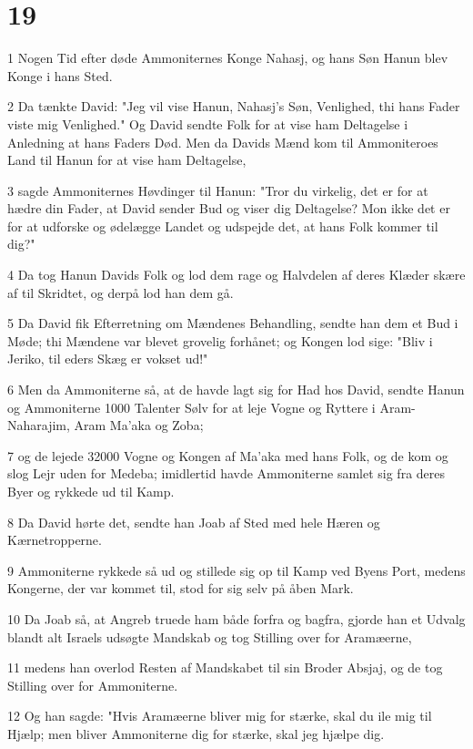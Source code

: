 \chapter{19}

\par 1 Nogen Tid efter døde Ammoniternes Konge Nahasj, og hans Søn Hanun blev Konge i hans Sted.
\par 2 Da tænkte David: "Jeg vil vise Hanun, Nahasj's Søn, Venlighed, thi hans Fader viste mig Venlighed." Og David sendte Folk for at vise ham Deltagelse i Anledning at hans Faders Død. Men da Davids Mænd kom til Ammoniteroes Land til Hanun for at vise ham Deltagelse,
\par 3 sagde Ammoniternes Høvdinger til Hanun: "Tror du virkelig, det er for at hædre din Fader, at David sender Bud og viser dig Deltagelse? Mon ikke det er for at udforske og ødelægge Landet og udspejde det, at hans Folk kommer til dig?"
\par 4 Da tog Hanun Davids Folk og lod dem rage og Halvdelen af deres Klæder skære af til Skridtet, og derpå lod han dem gå.
\par 5 Da David fik Efterretning om Mændenes Behandling, sendte han dem et Bud i Møde; thi Mændene var blevet grovelig forhånet; og Kongen lod sige: "Bliv i Jeriko, til eders Skæg er vokset ud!"
\par 6 Men da Ammoniterne så, at de havde lagt sig for Had hos David, sendte Hanun og Ammoniterne 1000 Talenter Sølv for at leje Vogne og Ryttere i Aram-Naharajim, Aram Ma'aka og Zoba;
\par 7 og de lejede 32000 Vogne og Kongen af Ma'aka med hans Folk, og de kom og slog Lejr uden for Medeba; imidlertid havde Ammoniterne samlet sig fra deres Byer og rykkede ud til Kamp.
\par 8 Da David hørte det, sendte han Joab af Sted med hele Hæren og Kærnetropperne.
\par 9 Ammoniterne rykkede så ud og stillede sig op til Kamp ved Byens Port, medens Kongerne, der var kommet til, stod for sig selv på åben Mark.
\par 10 Da Joab så, at Angreb truede ham både forfra og bagfra, gjorde han et Udvalg blandt alt Israels udsøgte Mandskab og tog Stilling over for Aramæerne,
\par 11 medens han overlod Resten af Mandskabet til sin Broder Absjaj, og de tog Stilling over for Ammoniterne.
\par 12 Og han sagde: "Hvis Aramæerne bliver mig for stærke, skal du ile mig til Hjælp; men bliver Ammoniterne dig for stærke, skal jeg hjælpe dig.
